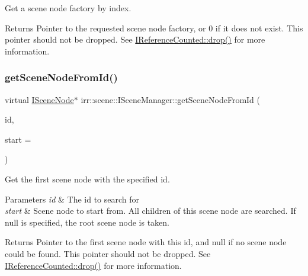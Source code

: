 Get a scene node factory by index. 

\begin{DoxyReturn}{Returns}
Pointer to the requested scene node factory, or 0 if it does not exist. This pointer should not be dropped. See \hyperlink{classirr_1_1IReferenceCounted_a03856a09355b89d178090c4a5f738543}{I\+Reference\+Counted\+::drop()} for more information. 
\end{DoxyReturn}
\mbox{\label{classirr_1_1scene_1_1ISceneManager_a038e2afb1397fe8f2b6f8f6c55d52b55}} 
\subsubsection{\texorpdfstring{get\+Scene\+Node\+From\+Id()}{getSceneNodeFromId()}}
{\footnotesize\ttfamily virtual \hyperlink{classirr_1_1scene_1_1ISceneNode}{I\+Scene\+Node}$\ast$ irr\+::scene\+::\+I\+Scene\+Manager\+::get\+Scene\+Node\+From\+Id (\begin{DoxyParamCaption}\item[{\hyperlink{namespaceirr_ac66849b7a6ed16e30ebede579f9b47c6}{s32}}]{id,  }\item[{\hyperlink{classirr_1_1scene_1_1ISceneNode}{I\+Scene\+Node} $\ast$}]{start = {} }\end{DoxyParamCaption})\hspace{0.3cm}{\ttfamily [pure virtual]}}



Get the first scene node with the specified id. 


\begin{DoxyParams}{Parameters}
{\em id} & The id to search for \\
\hline
{\em start} & Scene node to start from. All children of this scene node are searched. If null is specified, the root scene node is taken. \\
\hline
\end{DoxyParams}
\begin{DoxyReturn}{Returns}
Pointer to the first scene node with this id, and null if no scene node could be found. This pointer should not be dropped. See \hyperlink{classirr_1_1IReferenceCounted_a03856a09355b89d178090c4a5f738543}{I\+Reference\+Counted\+::drop()} for more information. 
\end{DoxyReturn}
\mbox{\label{classirr_1_1scene_1_1ISceneManager_a13ada3cca4b9eadee5e8ba3ccb6683da}} 
